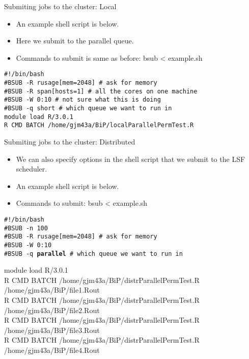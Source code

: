 \documentclass[table]{beamer}\usepackage[]{graphicx}\usepackage[]{color}
\begin{document}
\begin{frame}{Submiting jobs to the cluster: Local}
\begin{itemize}
\item An example shell script is below. 
\item Here we submit to the parallel queue.
\item Commands to submit is same as before: bsub < example.sh
\end{itemize}
{\tt \#!/bin/bash\\
\#BSUB -R rusage[mem=2048] \# ask for memory\\
\#BSUB -R span[hosts=1]    \# all the cores on one machine\\
\#BSUB -W 0:10             \# not sure what this is doing\\
\#BSUB -q short  \# which queue we want to run in\\

module load R/3.0.1\\
R CMD BATCH /home/gjm43a/BiP/localParallelPermTest.R}
\end{frame}

\begin{frame}{Submiting jobs to the cluster: Distributed}
\begin{itemize}
\item We can also specify options in the shell script that we submit to the LSF scheduler.  
\item An example shell script is below. 
\item Commands to submit: bsub < example.sh
\end{itemize}
{\tt \#!/bin/bash\\
\#BSUB -n 100\\
\#BSUB -R rusage[mem=2048] \# ask for memory\\
\#BSUB -W 0:10\\
\#BSUB -q {\bf parallel}  \# which queue we want to run in

module load R/3.0.1\\
R CMD BATCH /home/gjm43a/BiP/distrParallelPermTest.R /home/gjm43a/BiP/file1.Rout\\
R CMD BATCH /home/gjm43a/BiP/distrParallelPermTest.R /home/gjm43a/BiP/file2.Rout\\
R CMD BATCH /home/gjm43a/BiP/distrParallelPermTest.R /home/gjm43a/BiP/file3.Rout\\
R CMD BATCH /home/gjm43a/BiP/distrParallelPermTest.R /home/gjm43a/BiP/file4.Rout}
\end{frame}
\end{document}
